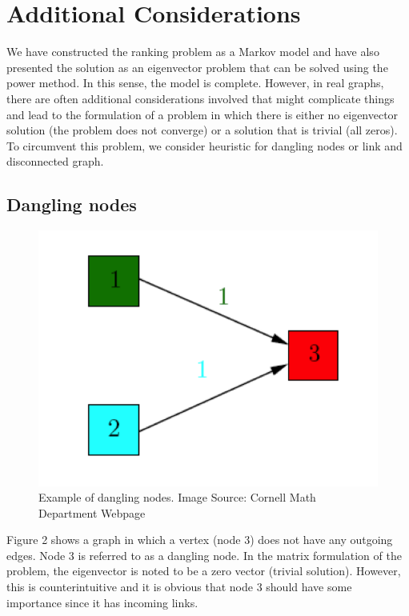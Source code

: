 \documentclass[9.5pt]{extarticle}
\begin{document}
\section{Additional Considerations}

We have constructed the ranking problem as a Markov model and have also presented the solution as an eigenvector problem that can be solved using the power method. In this sense, the model is complete. However, in real graphs, there are often additional considerations involved that might complicate things and lead to the formulation of a problem in which there is either no eigenvector solution (the problem does not converge) or a solution that is trivial (all zeros). To circumvent this problem, we consider heuristic for dangling nodes or link and disconnected graph.

\subsection{Dangling nodes}

\begin{figure}[H]
\centering
\includegraphics[scale=0.5]{dangling.png}
\caption{Example of dangling nodes. Image Source: Cornell Math Department Webpage}
\label{Figure 2}
\end{figure}

Figure 2 shows a graph in which a vertex (node 3) does not have any outgoing edges. Node 3 is referred to as a dangling node. In the matrix formulation of the problem, the eigenvector is noted to be a zero vector (trivial solution). However, this is counterintuitive and it is obvious that node 3 should have some importance since it has incoming links. \\
\end{document}
